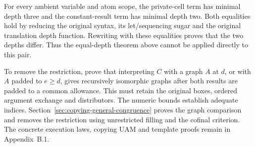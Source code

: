 

For every ambient variable and atom scope, the private-cell term has minimal
depth three and the constant-result term has minimal depth two. Both equalities
hold by reducing the original syntax, its let/sequencing sugar and the original
translation depth function. Rewriting with these equalities proves that the
two depths differ. Thus the equal-depth theorem above cannot be applied
directly to this pair.

To remove the restriction, prove that interpreting $C$ with a graph $A$ at
$d$, or with $A$ padded to $e\geq d$, gives recursively isomorphic graphs
after both results are padded to a common allowance. This must retain the
original boxes, ordered argument exchange and distributors. The numeric
bounds establish adequate indices. Section~\ref{sec:copying-general-congruence}
proves the graph comparison and removes the restriction using unrestricted
filling and the cofinal criterion. The concrete execution laws, copying UAM
and template proofs remain in Appendix~B.1.



